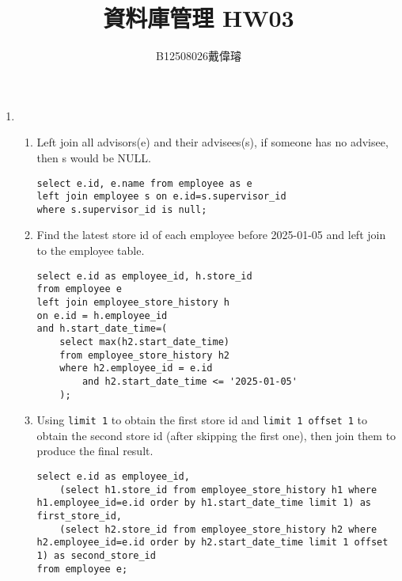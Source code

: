 \documentclass[12pt,a4paper]{article}
\title{資料庫管理 HW03}
\author{B12508026戴偉璿}
\date{}
\begin{document}
\maketitle


\begin{enumerate}
    \item 
    \begin{enumerate}
        \item Left join all advisors(e) and their advisees(s), if someone has no advisee, then s would be NULL.
        \begin{verbatim}
select e.id, e.name from employee as e
left join employee s on e.id=s.supervisor_id
where s.supervisor_id is null;
        \end{verbatim}
        \item Find the latest store id of each employee before 2025-01-05 and left join to the employee table.
        \begin{verbatim}
select e.id as employee_id, h.store_id
from employee e
left join employee_store_history h
on e.id = h.employee_id
and h.start_date_time=(
    select max(h2.start_date_time)
    from employee_store_history h2
    where h2.employee_id = e.id
        and h2.start_date_time <= '2025-01-05'
    );           
        \end{verbatim}
        \item Using \texttt{limit 1} to obtain the first store id and \texttt{limit 1 offset 1} to obtain the second store id (after skipping the first one), then join them to produce the final result.
        \begin{verbatim}
select e.id as employee_id,
    (select h1.store_id from employee_store_history h1 where h1.employee_id=e.id order by h1.start_date_time limit 1) as first_store_id,
    (select h2.store_id from employee_store_history h2 where h2.employee_id=e.id order by h2.start_date_time limit 1 offset 1) as second_store_id
from employee e;
        \end{verbatim}
    \end{enumerate}
\end{enumerate}
\end{document}

